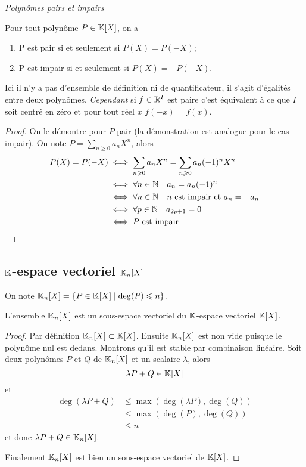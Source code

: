 \emph{Polynômes pairs et impairs}

\begin{prop}
  Pour tout polynôme \(P \in \mathbb{K}[X]\), on a
  \begin{enumerate}
    \item P est pair si et seulement si \(P(X)=P(-X)\);
    \item P est impair si et seulement si \(P(X)=-P(-X)\).
  \end{enumerate}
\end{prop}

\danger Ici il n'y a pas d'ensemble de définition ni de quantificateur, il 
s'agit d'égalités entre deux polynômes. \emph{Cependant} si \(f \in \mathbb{R}^I\) est 
paire c'est équivalent à ce que \(I\) soit centré en zéro et pour tout réel 
\(x\) \(f(-x)=f(x)\).

\begin{proof}
  On le démontre pour \(P\) pair (la démonstration est analogue pour le cas 
  impair). On note \(P = \sum_{n\geqslant 0} a_n X^n\), alors
  \begin{align}
    P(X) = P(-X) &\iff \sum_{n \geqslant 0} a_n X^n = \sum_{n \geqslant 0} a_n 
    (-1)^n X^n\\
    &\iff \forall n \in \mathbb{N} \quad a_n=a_n(-1)^n\\
    &\iff \forall n \in \mathbb{N} \quad n \text{~est impair et~} a_n=-a_n\\
    &\iff \forall p \in \mathbb{N} \quad a_{2p+1}=0\\
    &\iff P \text{~est impair}
  \end{align}
\end{proof}

\subsection{\(\mathbb{K}\)-espace vectoriel \(\mathbb{K}_n[X]\)}

On note \(\mathbb{K}_n[X]=\left\{P \in \mathbb{K}[X]\mathrel{}\middle|\mathrel{}\deg(P) \leqslant n\right\}\).

\begin{prop}
  L'ensemble \(\mathbb{K}_n[X]\) est un sous-espace vectoriel du \(\mathbb{K}\)-espace vectoriel 
  \(\mathbb{K}[X]\).
\end{prop}
\begin{proof}
  Par définition \(\mathbb{K}_n[X] \subset \mathbb{K}[X]\). Ensuite \(\mathbb{K}_n[X]\) est non vide 
  puisque le polynôme nul est dedans. Montrons qu'il est stable par combinaison 
  linéaire. Soit deux polynômes \(P\) et \(Q\) de \(\mathbb{K}_n[X]\) et un scalaire 
  \(\lambda\), alors
  \begin{equation}
    \lambda P +Q \in \mathbb{K}[X]
  \end{equation}
  et
  \begin{align}
    \deg(\lambda P+Q) &\leqslant \max(\deg(\lambda P),\deg(Q))\\
    &\leqslant \max(\deg(P),\deg(Q))\\
    &\leqslant n
  \end{align}
  et donc \(\lambda P +Q \in \mathbb{K}_n[X]\).

Finalement \(\mathbb{K}_n[X]\) est bien un sous-espace vectoriel de \(\mathbb{K}[X]\). 
\end{proof}

